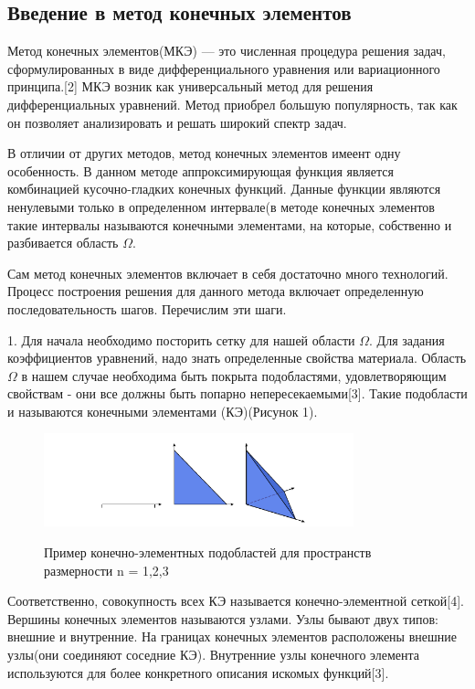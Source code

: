 \subsection{Введение в метод конечных элементов}

Метод конечных элементов(МКЭ) — это численная процедура решения задач,
сформулированных в виде дифференциального уравнения или вариационного 
принципа.[2]
МКЭ возник как универсальный метод для решения дифференциальных уравнений. 
Метод приобрел большую популярность, так как он позволяет анализировать и
решать широкий спектр задач.


В отличии от других методов, метод конечных элементов имеент одну особенность.
В данном методе аппроксимирующая функция является комбинацией кусочно-гладких конечных функций.
Данные функции являются ненулевыми только в определенном интервале(в методе конечных элементов такие интервалы
называются конечными элементами, на которые, собственно и разбивается область $\Omega$.

Сам метод конечных элементов включает в себя достаточно много технологий. 
Процесс построения решения для данного метода включает
определенную последовательность шагов. Перечислим эти шаги.

1. Для начала необходимо посторить сетку для нашей области $\Omega$.
Для задания коэффициентов уравнений, надо знать определенные свойства материала.
Область $\Omega$ в нашем случае необходима быть покрыта подобластями, удовлетворяющим свойствам - 
они все должны быть попарно непересекаемыми[3]. Такие подобласти и называются конечными элементами (КЭ)(Рисунок 1).

\renewcommand{\figurename}{Рисунок}
\begin{figure}[H]
      \centering
      \includegraphics[width=0.8\textwidth]{./pics/random-cells.png}\\
      \centering\caption{Пример конечно-элементных подобластей для пространств размерности n = 1,2,3}
\end{figure}
Соответственно, совокупность всех КЭ называется конечно-элементной сеткой[4].
Вершины конечных элементов называются узлами. Узлы бывают двух типов: внешние и внутренние.
На границах конечных элементов расположены внешние узлы(они соединяют соседние КЭ).
Внутренние узлы конечного элемента используются для более конкретного описания искомых функций[3].

